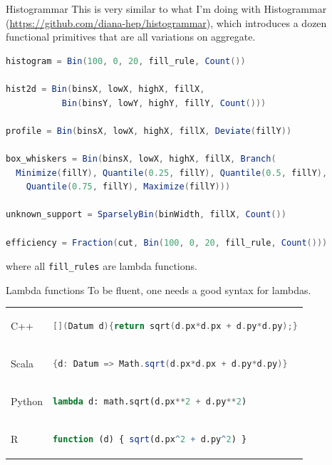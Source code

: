 \documentclass{beamer}
\begin{document}
\begin{frame}[fragile]{Histogrammar}
\vspace{0.5 cm}
This is very similar to what I'm doing with Histogrammar (\textcolor{blue}{\small \url{https://github.com/diana-hep/histogrammar}}), which introduces a dozen functional primitives that are all variations on aggregate.

\vfill
\begin{lstlisting}[language=scala, basicstyle=\ttfamily\scriptsize]
histogram = Bin(100, 0, 20, fill_rule, Count())

hist2d = Bin(binsX, lowX, highX, fillX,
           Bin(binsY, lowY, highY, fillY, Count()))

profile = Bin(binsX, lowX, highX, fillX, Deviate(fillY))

box_whiskers = Bin(binsX, lowX, highX, fillX, Branch(
  Minimize(fillY), Quantile(0.25, fillY), Quantile(0.5, fillY),
    Quantile(0.75, fillY), Maximize(fillY)))

unknown_support = SparselyBin(binWidth, fillX, Count())

efficiency = Fraction(cut, Bin(100, 0, 20, fill_rule, Count()))
\end{lstlisting}

where all {\small\tt fill\_rules} are lambda functions.
\end{frame}

\begin{frame}[fragile]{Lambda functions}
\vspace{0.5 cm}
To be fluent, one needs a good syntax for lambdas.

\vspace{0.25 cm}
\renewcommand{\baselinestretch}{2}
\begin{tabular}{l l}
C++ & \begin{lstlisting}[language=c, basicstyle=\ttfamily\scriptsize]
[](Datum d){return sqrt(d.px*d.px + d.py*d.py);}
\end{lstlisting} \\

Scala & \begin{lstlisting}[language=scala, basicstyle=\ttfamily\scriptsize]
{d: Datum => Math.sqrt(d.px*d.px + d.py*d.py)}
\end{lstlisting} \\

Python & \begin{lstlisting}[language=python, basicstyle=\ttfamily\scriptsize]
lambda d: math.sqrt(d.px**2 + d.py**2)
\end{lstlisting} \\

R & \begin{lstlisting}[language=r, basicstyle=\ttfamily\scriptsize]
function (d) { sqrt(d.px^2 + d.py^2) }
\end{lstlisting}
\end{tabular}
\renewcommand{\baselinestretch}{1}
\end{frame}
\end{document}
